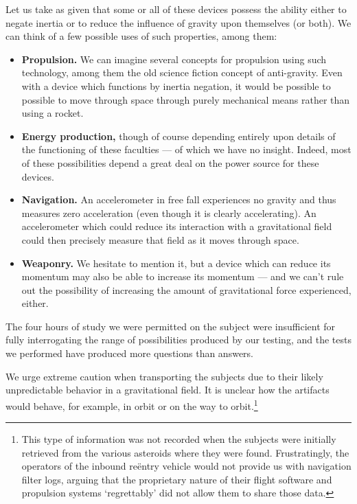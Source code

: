 \documentclass[10pt]{article}
\theoremstyle{definition}
\begin{document}
Let us take as given that some or all of these devices possess the ability either to negate inertia or to reduce the influence of gravity upon themselves (or both).
We can think of a few possible uses of such properties, among them:
\begin{itemize}
\item \textbf{Propulsion.} We can imagine several concepts for propulsion using such technology, among them the old science fiction concept of anti-gravity. Even with a device which functions by inertia negation, it would be possible to possible to move through space through purely mechanical means rather than using a rocket.
\item \textbf{Energy production,} though of course depending entirely upon details of the functioning of these faculties --- of which we have no insight. Indeed, most of these possibilities depend a great deal on the power source for these devices.
\item \textbf{Navigation.} An accelerometer in free fall experiences no gravity and thus measures zero acceleration (even though it is clearly accelerating). An accelerometer which could reduce its interaction with a gravitational field could then precisely measure that field as it moves through space.
\item \textbf{Weaponry.} We hesitate to mention it, but a device which can reduce its momentum may also be able to increase its momentum --- and we can't rule out the possibility of increasing the amount of gravitational force experienced, either.
\end{itemize}

 
The four hours of study we were permitted on the subject were insufficient for fully interrogating the range of possibilities produced by our testing, and the tests we performed have produced more questions than answers.

We urge extreme caution when transporting the subjects due to their likely unpredictable behavior in a gravitational field.
It is unclear how the artifacts would behave, for example, in orbit or on the way to orbit.\footnote{This type of information was not recorded when the subjects were initially retrieved from the various asteroids where they were found. Frustratingly, the operators of the inbound re\"entry vehicle would not provide us with navigation filter logs, arguing that the proprietary nature of their flight software and propulsion systems `regrettably' did not allow them to share those data.}

%
%
\end{document}
